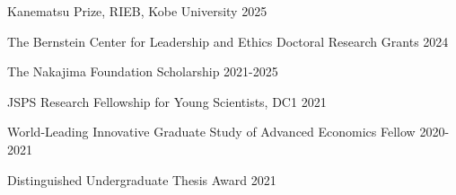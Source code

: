 
\begin{cventries}

\cventrysimple
    {Kanematsu Prize, RIEB, Kobe University}  %
    {2025} %
    {}
	
\cventrysimple
    {The Bernstein Center for Leadership and Ethics Doctoral Research Grants}  %
    {2024} %
    {}
	
\cventrysimple
    {The Nakajima Foundation Scholarship}  %
    {2021-2025} %
    {}
	
\cventrysimple
	{JSPS Research Fellowship for Young Scientists, DC1}  %
    {2021} %
    {}

\cventrysimple
	{World-Leading Innovative Graduate Study of Advanced Economics Fellow}  %
    {2020-2021} %
    {}

\cventrysimple
    {Distinguished Undergraduate Thesis Award}  %
    {2021} %
    {}


\end{cventries}
